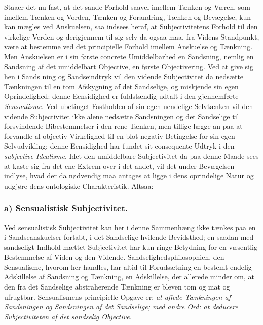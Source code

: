 \documentclass[11pt]{book}
\newcommand{\opage}[1]{\marginnote{\footnotesize\textit{[#1]}}}
\begin{document}
Staaer det nu fast, at det sande Forhold saavel imellem Tænken og
Væren, som imellem Tænken og Vorden, Tænken og Forandring, Tænken og
Bevægelse, kun kan mægles ved Anskuelsen, saa indsees heraf, at
Subjectivitetens Forhold til den virkelige Verden og derigjennem til
sig selv da ogsaa maa, fra Videns Standpunkt, være at bestemme ved
det principielle Forhold imellem Anskuelse og Tænkning. Men
Anskuelsen er i sin første concrete Umiddelbarhed en Sandsning,
nemlig en Sandsning af det umiddelbart Objective, en første
Objectivering. Ved at give sig hen i Sands\-%
\opage{24} \setcounter{footnote}{0}%
ning og Sandseindtryk vil den vidende Subjectivitet da nedsætte
Tænkningen til en tom Afskygning af det Sandselige, og miskjende sin
egen Oprindelighed: denne Eensidighed er fuldstændig udtalt i den
gjennemførte \emph{Sensualisme}. Ved ubetinget Fastholden af sin egen
uendelige Selvtænken vil den vidende Subjectivitet ikke alene
nedsætte Sandsningen og det Sandselige til forsvindende
Bibestemmelser i den rene Tænken, men tillige lægge an paa at
forvandle al objectiv Virkelighed til en blot negativ Betingelse for
sin egen Selvudvikling: denne Eensidighed har fundet sit consequente
Udtryk i den \emph{subjective Idealisme}. Idet den umiddelbare
Subjectivitet da paa denne Maade sees at kaste sig fra det ene Extrem
over i det andet, vil det under Bevægelsen indlyse, hvad der da
nødvendig maa antages at ligge i dens oprindelige Natur og udgjøre
dens ontologiske Charakteristik. Altsaa:

\subsubsection*{a) Sensualistisk Subjectivitet.}

Ved sensualistisk Subjectivitet kan her i denne Sammenhæng ikke
tænkes paa en i Sandseanskuelser fortabt, i det Sandselige hvilende
Bevidsthed; en saadan med sandseligt Indhold mættet Subjectivitet har
kun ringe Betydning for en væsentlig Bestemmelse af Viden og den
Vidende. Sandselighedsphilosophien, den Sensualisme, hvorom her
handles, har altid til Forudsætning en bestemt endelig Adskillelse af
Sandsning og Tænkning, en Adskillelse, der allerede minder om, at den
fra det Sandselige abstraherende Tænkning er bleven tom og mat og
ufrugtbar. Sensualismens principielle Opgave er: \emph{at aflede
Tænkningen af Sandsningen og Sandsningen af det Sandselige; med andre
Ord: at deducere Subjectiviteten af det sandselig Objective.}
\end{document}
